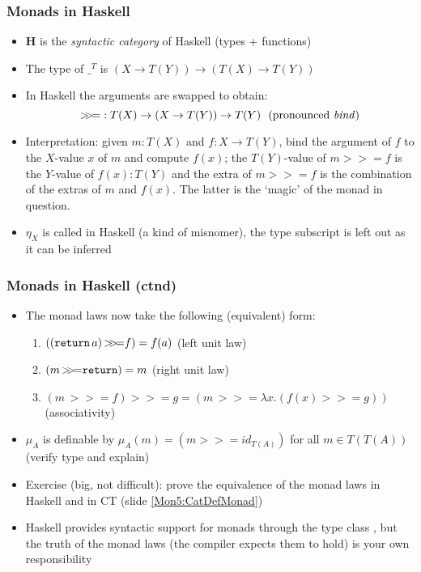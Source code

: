 \documentclass[handout]{beamer}
\newcommand{\bfsf}[1]{{\boldsymbol{#1}}}
\newcommand{\HH}{\bfsf{H}}
\newcommand{\bind}{{>}\!\!{>}\!{=}}
\newcommand{\ttt}[1]{\text{\tt #1}}
\begin{document}
\frame
  {   
    \frametitle{Monads in Haskell}\label{Mon5:MonadHask}

 \begin{itemize}[<+->]
\item $\HH$ is the \emph{syntactic category} of Haskell (types + functions)
\item The type of $\_^T$ is $(X\to T(Y)) \to (T(X)\to T(Y))$
\item In Haskell the arguments are swapped to obtain:
$$\bind : T(X) \to (X\to T(Y)) \to T(Y)~~\text{(pronounced \emph{bind}})$$
\item Interpretation: given $m:T(X)$ and $f: X\to T(Y)$, %
bind the argument of $f$ to the $X$-value $x$ of $m$ and compute $f(x)$;
the $T(Y)$-value of $m\bind f$ is the $Y$-value of $f(x):T(Y)$ and
the extra of $m\bind f$ is the {\color{red}combination} of 
the extras of $m$ and $f(x)$. The latter is the `magic' of the monad in question.
\item $\eta_X$ is called \ttt{return} in Haskell (a kind of misnomer),
the type subscript is left out as it can be inferred


 \end{itemize}

 }

\frame
  {   
    \frametitle{Monads in Haskell (ctnd)}\label{Mon5:MonadHaskCtnd}

 \begin{itemize}[<+->]
\item The monad laws now take the following (equivalent) form:
\begin{enumerate}
    \item $((\ttt{return}\,a)\, \bind f) = f(a)$ (left unit law)
    \item $(m\, \bind \ttt{return}) = m$ (right unit law)
    \item $(m\, \bind f) \bind g = (m\, \bind \lambda x. (f(x) \bind g))$ (associativity)
 \end{enumerate}
\item $\mu_A$ is definable by $\mu_A(m) = (m\bind id_{T(A)})$ for all $m\in T(T(A))$
(verify type and explain)
\item Exercise (big, not difficult): prove the equivalence of the monad laws in Haskell 
and in CT (slide \ref{Mon5:CatDefMonad})
\item Haskell provides syntactic support for monads through the type class
\href{https://wiki.haskell.org/All_About_Monads}%
{\color{blue}\ttt{Monad}}, but the truth of the monad laws (the compiler expects them to hold)
is your own responsibility
 \end{itemize}

 }
\end{document}
